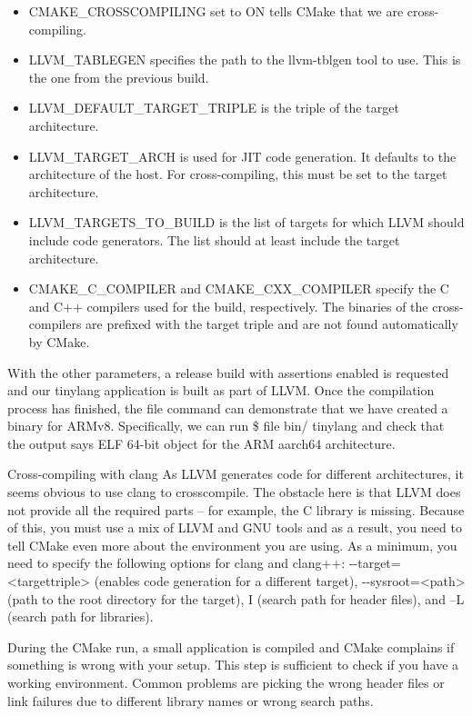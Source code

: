 \begin{itemize}
\item
CMAKE\_CROSSCOMPILING set to ON tells CMake that we are cross-compiling.

\item
LLVM\_TABLEGEN specifies the path to the llvm-tblgen tool to use. This is the one from the previous build.

\item
LLVM\_DEFAULT\_TARGET\_TRIPLE is the triple of the target architecture.

\item
LLVM\_TARGET\_ARCH is used for JIT code generation. It defaults to the architecture of the host. For cross-compiling, this must be set to the target architecture.

\item
LLVM\_TARGETS\_TO\_BUILD is the list of targets for which LLVM should include code generators. The list should at least include the target architecture.

\item
CMAKE\_C\_COMPILER and CMAKE\_CXX\_COMPILER specify the C and C++ compilers used for the build, respectively. The binaries of the cross-compilers are prefixed with the target triple and are not found automatically by CMake.
\end{itemize}

With the other parameters, a release build with assertions enabled is requested and our tinylang application is built as part of LLVM. Once the compilation process has finished, the file command can demonstrate that we have created a binary for ARMv8. Specifically, we can run \$ file bin/ tinylang and check that the output says ELF 64-bit object for the ARM aarch64 architecture.

\begin{myTip}{Cross-compiling with clang}
As LLVM generates code for different architectures, it seems obvious to use clang to crosscompile. The obstacle here is that LLVM does not provide all the required parts – for example, the C library is missing. Because of this, you must use a mix of LLVM and GNU tools and as a result, you need to tell CMake even more about the environment you are using. As a minimum, you need to specify the following options for clang and clang++: -{}-target=<targettriple> (enables code generation for a different target), -{}-sysroot=<path> (path to the root directory for the target), I (search path for header files), and –L (search path for libraries).

During the CMake run, a small application is compiled and CMake complains if something is wrong with your setup. This step is sufficient to check if you have a working environment. Common problems are picking the wrong header files or link failures due to different library names or wrong search paths.
\end{myTip}

